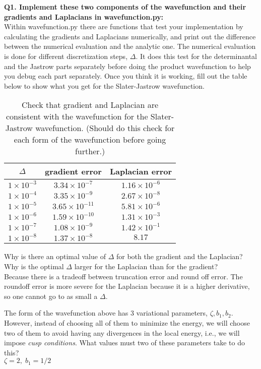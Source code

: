 \documentclass[11pt,aps,prb,amsmath,amssymb,superscriptaddress,notitlepage]{revtex4-1}
\providecommand{\tabularnewline}{\\}
\begin{document}
{\color{blue}
\textbf{Q1. Implement these two components of the wavefunction and their gradients and Laplacians in wavefunction.py:}\\
Within wavefunction.py there are functions that test your implementation by calculating the gradients
and Laplacians numerically, and print out the difference between the numerical evaluation and the analytic one.
The numerical evaluation is done for different discretization steps, $\Delta$.
It does this test for the determinantal and the Jastrow parts separately before doing the product wavefunction
to help you debug each part separately.
Once you think it is working, fill out the table below to show what you get for the Slater-Jastrow wavefunction.

\begin{table}[H]
\begin{center}
\color{blue}
\caption{Check that gradient and Laplacian are consistent with the wavefunction for the Slater-Jastrow wavefunction.
(Should do this check for each form of the wavefunction before going further.)}
\label{gradient_laplacian}
\begin{tabular}{|c|c|c|}
\hline
$\Delta$ & gradient error & Laplacian error \\
\hline
$1 \times 10^{-3}$ & $3.34 \times 10^{-7}$ & $1.16 \times 10^{-6}$\tabularnewline
\hline
$1 \times 10^{-4}$ & $3.35 \times 10^{-9}$ & $2.67 \times 10^{-8}$\tabularnewline
\hline
$1 \times 10^{-5}$ & $3.65 \times 10^{-11}$ & $5.81\times 10^{-6}$ \tabularnewline
\hline
$1 \times 10^{-6}$ & $1.59\times 10^{-10}$ & $1.31\times 10^{-3}$\tabularnewline
\hline
$1 \times 10^{-7}$ & $1.08\times 10^{-9}$ & $1.42\times 10^{-1}$\tabularnewline
\hline
$1 \times 10^{-8}$ & $1.37\times 10^{-8}$  & $8.17$\tabularnewline
\hline
\end{tabular}
\end{center}
\end{table}

Why is there an optimal value of $\Delta$ for both the gradient and the Laplacian?
Why is the optimal $\Delta$ larger for the Laplacian than for the gradient?\\
{\color{darkgreen} Because there is a tradeoff between truncation error and round off error.
The roundoff error is more severe for the Laplacian because it is a higher derivative, so one cannot go to as
small a $\Delta$.}

The form of the wavefunction above has 3 variational parameters, $\zeta, b_1, b_2$.
However, instead of choosing all of them to minimize the energy, we will choose two of them
to avoid having any divergences in the local energy, i.e., we will impose {\it cusp conditions}.
What values must two of these parameters take to do this?\\
{\color{darkgreen} $\zeta=2,\; b_1=1/2$}

}
\end{document}
